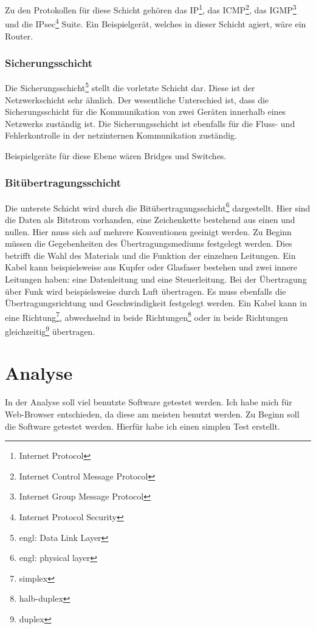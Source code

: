 \documentclass[12pt]{article}
\begin{document}
	Zu den Protokollen für diese Schicht gehören das IP\footnote{Internet Protocol}, das ICMP\footnote{Internet Control Message Protocol}, das IGMP\footnote{Internet Group Message Protocol} und die IPsec\footnote{Internet Protocol Security} Suite. Ein Beispielgerät, welches in dieser Schicht agiert, wäre ein Router.
	
\subsubsection{Sicherungsschicht}
	Die Sicherungsschicht\footnote{engl: Data Link Layer} stellt die vorletzte Schicht dar. Diese ist der Netzwerkschicht sehr ähnlich. Der wesentliche Unterschied ist, dass die Sicherungsschicht für die Kommunikation von zwei Geräten innerhalb eines Netzwerks zuständig ist. Die Sicherungsschicht ist ebenfalls für die Fluss- und Fehlerkontrolle in der netzinternen Kommunikation zuständig. 
	
	Beispielgeräte für diese Ebene wären Bridges und Switches.

\subsubsection{Bitübertragungsschicht}
	Die unterste Schicht wird durch die Bitübertragungsschicht\footnote{engl: physical layer} dargestellt. Hier sind die Daten als Bitstrom vorhanden, eine Zeichenkette bestehend aus einen und nullen. Hier muss sich auf mehrere Konventionen geeinigt werden. Zu Beginn müssen die Gegebenheiten des Übertragungsmediums festgelegt werden. Dies betrifft die Wahl des Materials und die Funktion der einzelnen Leitungen. Ein Kabel kann beispielsweise aus Kupfer oder Glasfaser bestehen und zwei innere Leitungen haben: eine Datenleitung und eine Steuerleitung. Bei der Übertragung über Funk wird beispielsweise durch Luft übertragen. Es muss ebenfalls die Übertragungsrichtung und Geschwindigkeit festgelegt werden. Ein Kabel kann in eine Richtung\footnote{simplex}, abwechselnd in beide Richtungen\footnote{halb-duplex} oder in beide Richtungen gleichzeitig\footnote{duplex} übertragen.





\section{Analyse}
In der Analyse soll viel benutzte Software getestet werden. Ich habe mich für Web-Browser entschieden, da diese am meisten benutzt werden.\cite{beliebteste-programme} Zu Beginn soll die Software getestet werden. Hierfür habe ich einen simplen Test erstellt.
\end{document}
